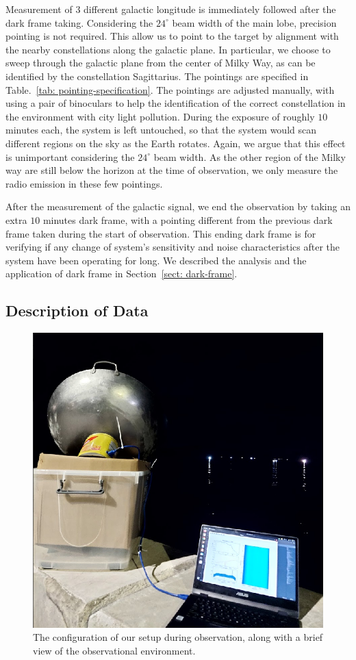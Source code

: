 \documentclass[12pt]{article}
\begin{document}
    Measurement of $3$ different galactic longitude is immediately followed after the dark frame taking. 
    Considering the $24^\circ$ beam width of the main lobe, precision pointing is not required. This allow us to point to the target by alignment with the nearby constellations along the galactic plane. 
    In particular, we choose to sweep through the galactic plane from the center of Milky Way, as can be identified by the constellation Sagittarius. 
    The pointings are specified in Table.~\ref{tab: pointing-specification}.
    The pointings are adjusted manually, with using a pair of binoculars to help the identification of the correct constellation in the environment with city light pollution.
    During the exposure of roughly $10$ minutes each, the system is left untouched, so that the system would scan different regions on the sky as the Earth rotates. 
    Again, we argue that this effect is unimportant considering the $24^\circ$ beam width.
    As the other region of the Milky way are still below the horizon at the time of observation, we only measure the radio emission in these few pointings.

    After the measurement of the galactic signal, we end the observation by taking an extra $10$ minutes dark frame, with a pointing different from the previous dark frame taken during the start of observation. 
    This ending dark frame is for verifying if any change of system's sensitivity and noise characteristics after the system have been operating for long.
    We described the analysis and the application of dark frame in Section~\ref{sect: dark-frame}. 
    
    \subsection{Description of Data}
    \begin{figure}
	    \centering
	    \includegraphics[width=.8\textwidth]{plots/wok-observation.png}
	    \caption{The configuration of our setup during observation, along with a brief view of the observational environment. } 
	    \label{fig: wok-in-onbservation}
    \end{figure}
\end{document}
